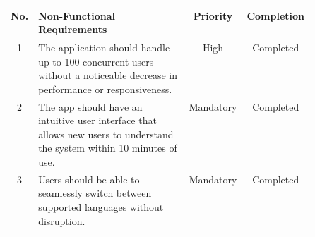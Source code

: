 \begin{table}[H]
    \centering
    \begin{tabular}{|c|>{\centering\arraybackslash}p{0.5\linewidth}|c|c|} 
    \hline
        \textbf{No.} & \textbf{Non-Functional Requirements} & \textbf{Priority} & \textbf{Completion}\\
             \hline
        1 & The application should handle up to 100 concurrent users without a noticeable decrease in performance or responsiveness. & High & Completed \\
        \hline
        2 & The app should have an intuitive user interface that allows new users to understand the system within 10 minutes of use. & Mandatory & Completed \\
        \hline
        3 & Users should be able to seamlessly switch between supported languages without disruption. & Mandatory & Completed \\
        \hline
    \end{tabular}
    \label{tab:table2}
\end{table}

